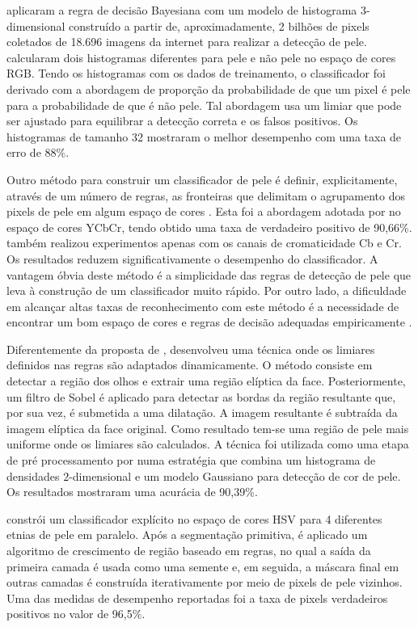 \citet{jones:02} aplicaram a regra de decisão Bayesiana com um modelo de histograma $3$-dimensional construído a partir de, aproximadamente, 2 bilhões de pixels coletados de 18.696 imagens da internet para realizar a detecção de pele. \citet{jones:02} calcularam dois histogramas diferentes para pele e não pele no espaço de cores RGB. Tendo os histogramas com os dados de treinamento, o classificador foi derivado com a abordagem de proporção da probabilidade de que um pixel é pele para a probabilidade de que é não pele. Tal abordagem usa um limiar que pode ser ajustado para equilibrar a detecção correta e os falsos positivos. Os histogramas de tamanho 32 mostraram o melhor desempenho com uma taxa de erro de 88\%.

Outro método para construir um classificador de pele é definir, explicitamente, através de um número de regras, as fronteiras que delimitam o agrupamento dos pixels de pele em algum espaço de cores \citep{vezhnevets:03}. Esta foi a abordagem adotada por \citet{kovac:03} no espaço de cores YCbCr, tendo obtido uma taxa de verdadeiro positivo de 90,66\%. \citet{kovac:03} também realizou experimentos apenas com os canais de cromaticidade Cb e Cr. Os resultados reduzem significativamente o desempenho do classificador. A vantagem óbvia deste método é a simplicidade das regras de detecção de pele que leva à construção de um classificador muito rápido. Por outro lado, a dificuldade em alcançar altas taxas de reconhecimento com este método é a necessidade de encontrar um bom espaço de cores e regras de decisão adequadas empiricamente \citep{vezhnevets:03}.

Diferentemente da proposta de \citet{kovac:03}, \citet{yogarajah:11} desenvolveu uma técnica onde os limiares definidos nas regras são adaptados dinamicamente. O método consiste em detectar a região dos olhos e extrair uma região elíptica da face. Posteriormente, um filtro de Sobel é aplicado para detectar as bordas da região resultante que, por sua vez, é submetida a uma dilatação. A imagem resultante é subtraída da imagem elíptica da face original. Como resultado tem-se uma região de pele mais uniforme onde os limiares são calculados. A técnica foi utilizada como uma etapa de pré processamento por \citet{tan:12} numa estratégia que combina um histograma de densidades $2$-dimensional e um modelo Gaussiano para detecção de cor de pele. Os resultados mostraram uma acurácia de 90,39\%.

\citet{naji:12} constrói um classificador explícito no espaço de cores HSV para 4 diferentes etnias de pele em paralelo. Após a segmentação primitiva, é aplicado um algoritmo de crescimento de região baseado em regras, no qual a saída da primeira camada é usada como uma semente e, em seguida, a máscara final em outras camadas é construída iterativamente por meio de pixels de pele vizinhos. Uma das medidas de desempenho reportadas foi a taxa de pixels verdadeiros positivos no valor de 96,5\%.

